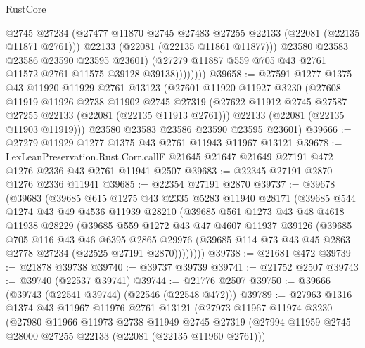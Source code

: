 \begin{lexlean}{RustCore}
\begin{coremodule}
                      @2745
                      @27234
                      (@27477 @11870 @2745 @27483 @27255 @22133 (@22081 (@22135 @11871 @2761)))
                      @22133
                      (@22081 (@22135 @11861 @11877)))
                    @23580
                    @23583
                    @23586
                    @23590
                    @23595
                    @23601)
                  (@27279 @11887 @559 @705 @43 @2761 @11572 @2761 @11575 @39128 @39138))))))))
@39658 := @27591
    @1277
    @1375
    @43
    @11920
    @11929
    @2761
    @13123
    (@27601
      @11920
      @11927
      @3230
      (@27608
        @11919
        @11926
        @2738
        @11902
        @2745
        @27319
        (@27622 @11912 @2745 @27587 @27255 @22133 (@22081 (@22135 @11913 @2761)))
        @22133
        (@22081 (@22135 @11903 @11919)))
      @23580
      @23583
      @23586
      @23590
      @23595
      @23601)
@39666 := @27279 @11929 @1277 @1375 @43 @2761 @11943 @11967 @13121
@39678 := LexLeanPreservation.Rust.Corr.callF
    @21645
    @21647
    @21649
    @27191
    @472
    @1276
    @2336
    @43
    @2761
    @11941
    @2507
@39683 := @22345 @27191 @2870 @1276 @2336 @11941
@39685 := @22354 @27191 @2870
@39737 := @39678
    (@39683
      (@39685
        @615
        @1275
        @43
        @2335
        @5283
        @11940
        @28171
        (@39685
          @544
          @1274
          @43
          @49
          @4536
          @11939
          @28210
          (@39685
            @561
            @1273
            @43
            @48
            @4618
            @11938
            @28229
            (@39685
              @559
              @1272
              @43
              @47
              @4607
              @11937
              @39126
              (@39685
                @705
                @116
                @43
                @46
                @6395
                @2865
                @29976
                (@39685 @114 @73 @43 @45 @2863 @2778 @27234 (@22525 @27191 @2870))))))))
@39738 := @21681 @472
@39739 := @21878 @39738
@39740 := @39737 @39739
@39741 := @21752 @2507
@39743 := @39740 (@22537 @39741)
@39744 := @21776 @2507
@39750 := @39666 (@39743 (@22541 @39744) (@22546 (@22548 @472)))
@39789 := @27963
    @1316
    @1374
    @43
    @11967
    @11976
    @2761
    @13121
    (@27973
      @11967
      @11974
      @3230
      (@27980
        @11966
        @11973
        @2738
        @11949
        @2745
        @27319
        (@27994 @11959 @2745 @28000 @27255 @22133 (@22081 (@22135 @11960 @2761)))

\end{coremodule}
\end{lexlean}
